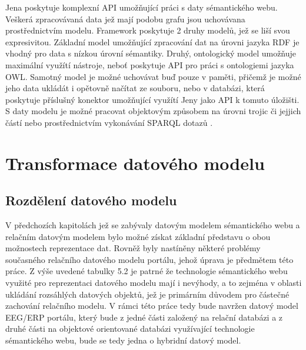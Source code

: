 \documentclass{projekt}
\begin{document}
Jena poskytuje komplexní API umožňující práci s daty sémantického webu. Veškerá zpracovávaná data jež mají podobu grafu jsou uchovávana prostřednictvím modelu. Framework poskytuje 2 druhy modelů, jež se liší svou expresivitou. Základní model umožňující zpracování dat na úrovni jazyka RDF je vhodný pro data s nízkou úrovní sémantiky. Druhý, ontologický model umožňuje maximální využítí nástroje, neboť poskytuje API pro práci s ontologiemi jazyka OWL. Samotný model je možné uchovávat buď pouze v paměti, přičemž je možné jeho data ukládát i opětovně načítat ze souboru, nebo v databázi, která poskytuje příslušný konektor umožňující využítí Jeny jako API k tomuto úložišti. S daty modelu je možné pracovat objektovým způsobem na úrovni trojic či jejjich částí nebo prostřednictvím vykonávání SPARQL dotazů \cite{_28}.




\chapter{Transformace datového modelu}
\section{Rozdělení datového modelu}
\hspace{0.65cm}V předchozích kapitolách jež se zabývaly datovým modelem sémantického webu a relačním datovým modelem bylo možné získat základní představu o obou možnostech reprezentace dat. Rovněž byly nastíněny některé problémy současného relačního datového modelu portálu, jehož úprava je předmětem této práce. Z výše uvedené tabulky 5.2 je patrné že technologie sémantického webu využité pro reprezentaci datového modelu mají i nevýhody, a to zejména v oblasti ukládání rozsáhlých datových objektů, jež je primárním důvodem pro částečné zachování relačního modelu. V rámci této práce tedy bude navržen datový model EEG/ERP portálu, který bude z jedné části  založený na relační databázi a z druhé části na objektové orientované databázi využívající technologie sémantického webu, bude se tedy jedna o hybridní datový model.
\end{document}
